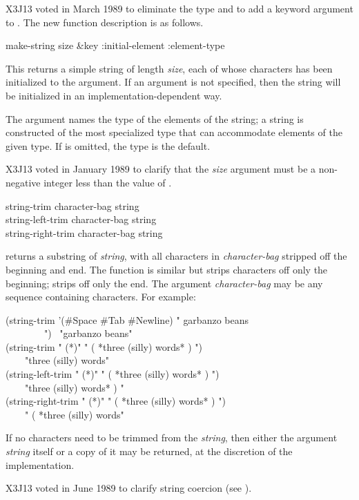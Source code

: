 \begin{newer}
X3J13 voted in March 1989 
to eliminate the type  and to add a keyword
argument  to .  The new function
description is as follows.

\begin{defun}[Function]
make-string size &key :initial-element :element-type

This returns a simple string
of length \emph{size}, each of whose characters
has been initialized to the  argument.
If an  argument is not specified, then the string will
be initialized in an implementation-dependent way.

The  argument names the type of the elements
of the string; a string is constructed of the most specialized type
that can accommodate elements of the given type.  If 
is omitted, the type  is the default.

X3J13 voted in January 1989
to clarify that the \emph{size} argument
must be a non-negative integer less than the value of
.
\end{defun}
\end{newer}

\begin{defun}[Function]
string-trim character-bag string \\
string-left-trim character-bag string \\
string-right-trim character-bag string

 returns a substring of \emph{string}, with all characters in
\emph{character-bag} stripped off the beginning and end.
The function  is similar but strips characters
off only the beginning;  strips off only the end.
The argument \emph{character-bag} may be any sequence containing
characters.
For example:
\begin{lisp}
(string-trim '(\#{\Xbackslash}Space \#{\Xbackslash}Tab \#{\Xbackslash}Newline) " garbanzo beans \\
~~~~~~~~") \EV\ "garbanzo beans" \\
(string-trim " (*)" " ( *three (silly) words* ) ") \\
~~~\EV\ "three (silly) words" \\
(string-left-trim " (*)" " ( *three (silly) words* ) ") \\
~~~\EV\ "three (silly) words* ) " \\
(string-right-trim " (*)" " ( *three (silly) words* ) ") \\
~~~\EV\ " ( *three (silly) words"
\end{lisp}
If no characters need to be trimmed from the \emph{string},
then either the argument \emph{string} itself or a copy of it may
be returned, at the discretion of the implementation.

\begin{newer}
X3J13 voted in June 1989 
to clarify string coercion (see ).
\end{newer}
\end{defun}

